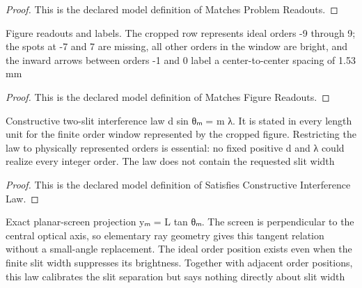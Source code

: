 \begin{proof}
  This is the declared model definition of Matches Problem Readouts.
\end{proof}
\begin{definition}
  \label{def:physics:phyx-mini-0122:phyxminiproblems-problemphyxmini0122-matchesfigurereadouts}
  Figure readouts and labels. The cropped row represents ideal orders -9 through 9; the spots at -7 and 7 are missing, all other orders in the window are bright, and the inward arrows between orders -1 and 0 label a center-to-center spacing of 1.53 mm
\end{definition}
\begin{proof}
  This is the declared model definition of Matches Figure Readouts.
\end{proof}
\begin{definition}
  \label{def:physics:phyx-mini-0122:phyxminiproblems-problemphyxmini0122-satisfiesconstructiveinterferencelaw}
  Constructive two-slit interference law d sin θₘ = m λ. It is stated in every length unit for the finite order window represented by the cropped figure. Restricting the law to physically represented orders is essential: no fixed positive d and λ could realize every integer order. The law does not contain the requested slit width
\end{definition}
\begin{proof}
  This is the declared model definition of Satisfies Constructive Interference Law.
\end{proof}
\begin{definition}
  \label{def:physics:phyx-mini-0122:phyxminiproblems-problemphyxmini0122-satisfiesplanarscreenprojection}
  Exact planar-screen projection yₘ = L tan θₘ. The screen is perpendicular to the central optical axis, so elementary ray geometry gives this tangent relation without a small-angle replacement. The ideal order position exists even when the finite slit width suppresses its brightness. Together with adjacent order positions, this law calibrates the slit separation but says nothing directly about slit width
\end{definition}
